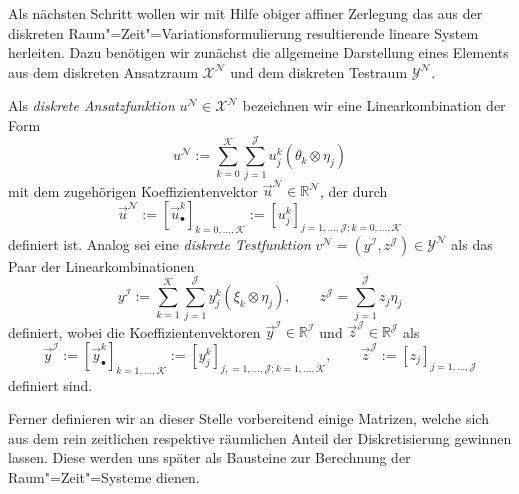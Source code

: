 \documentclass[../main.tex]{subfiles}
\begin{document}
Als nächsten Schritt wollen wir mit Hilfe obiger affiner Zerlegung das aus der diskreten Raum"=Zeit"=Variationsformulierung resultierende lineare System herleiten.
Dazu benötigen wir zunächst die allgemeine Darstellung eines Elements aus dem diskreten Ansatzraum $\mathcal X^{\mathcal N}$ und dem diskreten Testraum $\mathcal Y^{\mathcal N}$.

\begin{Definition}
\label{definition:diskrete_ansatz_und_testfunktionen}
    Als \emph{diskrete Ansatzfunktion} $u^{\mathcal N} \in \mathcal X^{\mathcal N}$ bezeichnen wir eine Linearkombination der Form
    \begin{equation}
    \label{eq:darstellung_diskrete_ansatzfunktion}
        u^{\mathcal N} := \sum_{k = 0}^{\mathcal K} \sum_{j = 1}^{\mathcal J} u_{j}^{k} (\theta_{k} \otimes \eta_{j})
    \end{equation}
    mit dem zugehörigen Koeffizientenvektor $\vec{u}^{\mathcal N} \in \mathbb{R}^{\mathcal N}$, der durch
    \begin{equation}
        \vec{u}^{\mathcal N} := [\vec{u}^{k}_{\bullet}]_{k = 0, \dots, \mathcal K} := [ u^{k}_{j} ]_{j = 1, \dots, \mathcal J;k = 0, \dots, \mathcal K}
    \end{equation}
    definiert ist.
    Analog sei eine \emph{diskrete Testfunktion} $v^{\mathcal N} = (y^{\mathcal I}, z^{\mathcal J}) \in \mathcal Y^{\mathcal N}$ als das Paar der Linearkombinationen
    \begin{equation}
    \label{eq:darstellung_diskrete_testfunktion}
        y^{\mathcal I} := \sum_{k = 1}^{\mathcal K} \sum_{j = 1}^{\mathcal J} y_{j}^{k} (\xi_{k} \otimes \eta_{j}), \qquad
        z^{\mathcal J} = \sum_{j = 1}^{\mathcal J} z_{j} \eta_{j}
    \end{equation}
    definiert,
    wobei die Koeffizientenvektoren $\vec{y}^{\mathcal I} \in \mathbb{R}^{\mathcal I}$ und $\vec{z}^{\mathcal J} \in \mathbb{R}^{\mathcal J}$ als
    \begin{equation}
        \vec{y}^{\mathcal I} := [\vec{y}^{k}_{\bullet}]_{k = 1, \dots, \mathcal K} := [y^{k}_{j}]_{j, = 1, \dots, \mathcal J; k = 1, \dots, \mathcal K}, \qquad
        \vec{z}^{\mathcal J} := [z_{j}]_{j = 1, \dots, \mathcal J}
    \end{equation}
    definiert sind.
\end{Definition}

Ferner definieren wir an dieser Stelle vorbereitend einige Matrizen, welche sich aus dem rein zeitlichen respektive räumlichen Anteil der Diskretisierung gewinnen lassen.
Diese werden uns später als Bausteine zur Berechnung der Raum"=Zeit"=Systeme dienen.
\end{document}
